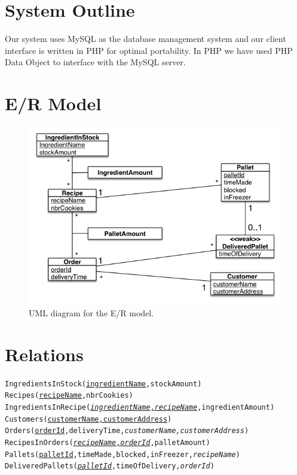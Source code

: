 \documentclass[a4paper]{article}
\begin{document}
\section{System Outline}
Our system uses MySQL as the database management system and our client interface is written in PHP for optimal portability. In PHP we have used PHP Data Object to interface with the MySQL server.

\begin{description}
\item{}
\end{description}
\section{E/R Model}
\begin{figure}[!h]
\centering
\includegraphics[scale=0.7]{projectUMLFinal.png}
\caption{UML diagram for the E/R model.}
\label{uml}
\end{figure}

\section{Relations}

\texttt{IngredientsInStock(\underline{ingredientName},stockAmount)} \\
\texttt{Recipes(\underline{recipeName},nbrCookies)} \\
\texttt{IngredientsInRecipe(\underline{\textit{ingredientName},\textit{recipeName}},ingredientAmount)} \\
\texttt{Customers(\underline{customerName,customerAddress})} \\
\texttt{Orders(\underline{orderId},deliveryTime,\textit{customerName,customerAddress})} \\
\texttt{RecipesInOrders(\underline{\textit{recipeName},\textit{orderId}},palletAmount)} \\
\texttt{Pallets(\underline{palletId},timeMade,blocked,inFreezer,\textit{recipeName})} \\
\texttt{DeliveredPallets(\underline{\textit{palletId}},timeOfDelivery,\textit{orderId})}
\end{document}
